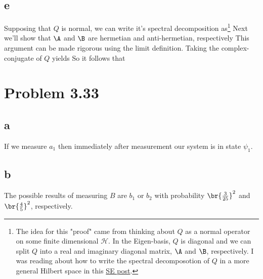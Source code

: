 \subsection*{e}
Supposing that $Q$ is normal, we can write it's spectral decomposition as\footnote{The idea for this "proof" came from thinking about $Q$ as a normal operator on some finite dimensional $\mathcal{H}$. In the Eigen-basis, $Q$ is diagonal and we can split $Q$ into a real and imaginary diagonal matrix, $\A$ and $\B$, respectively. I was reading about how to write the spectral decomposotion of $Q$ in a more general Hilbert space in this
\hyperlink{https://math.stackexchange.com/questions/2639219/why-denote-the-spectral-decomposition-of-a-bounded-operator-as-an-integral}{SE post}.}
Next we'll show that $\A$ and $\B$ are hermetian and anti-hermetian, respectively
This argument can be made rigorous using the limit definition. Taking the complex-conjugate of $Q$ yields
So it follows that

\section*{Problem 3.33}
\subsection*{a}
If we measure $a_1$ then immediately after measurement our system is in state $\psi_1$.
\subsection*{b}
The possible results of measuring $B$ are $b_1$ or $b_2$ with probability $\br{\frac{3}{25}}^2$ and $\br{\frac{4}{5}}^2$, respectively.

